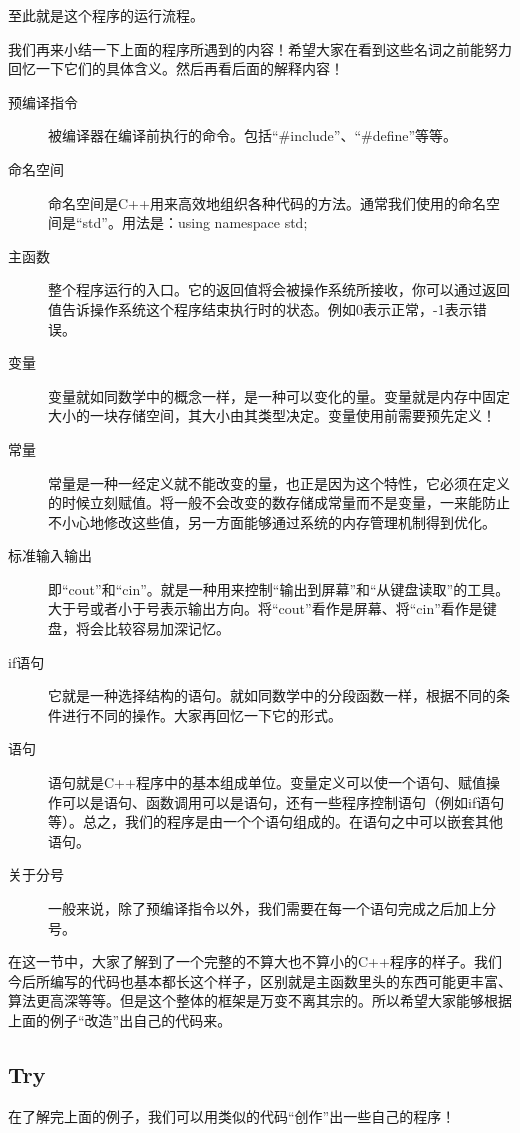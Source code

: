 至此就是这个程序的运行流程。

我们再来小结一下上面的程序所遇到的内容！希望大家在看到这些名词之前能努力回忆一下它们的具体含义。然后再看后面的解释内容！

\begin{description}
	\item[预编译指令]被编译器在编译前执行的命令。包括“\#include”、“\#define”等等。
	\item[命名空间]命名空间是C++用来高效地组织各种代码的方法。通常我们使用的命名空间是“std”。用法是：using namespace std;
	\item[主函数]整个程序运行的入口。它的返回值将会被操作系统所接收，你可以通过返回值告诉操作系统这个程序结束执行时的状态。例如0表示正常，-1表示错误。
	\item[变量]变量就如同数学中的概念一样，是一种可以变化的量。变量就是内存中固定大小的一块存储空间，其大小由其类型决定。变量使用前需要预先定义！
	\item[常量]常量是一种一经定义就不能改变的量，也正是因为这个特性，它必须在定义的时候立刻赋值。将一般不会改变的数存储成常量而不是变量，一来能防止不小心地修改这些值，另一方面能够通过系统的内存管理机制得到优化。
	\item[标准输入输出]即“cout”和“cin”。就是一种用来控制“输出到屏幕”和“从键盘读取”的工具。大于号或者小于号表示输出方向。将“cout”看作是屏幕、将“cin”看作是键盘，将会比较容易加深记忆。
	\item[if语句]它就是一种选择结构的语句。就如同数学中的分段函数一样，根据不同的条件进行不同的操作。大家再回忆一下它的形式。
	\item[语句]语句就是C++程序中的基本组成单位。变量定义可以使一个语句、赋值操作可以是语句、函数调用可以是语句，还有一些程序控制语句（例如if语句等）。总之，我们的程序是由一个个语句组成的。在语句之中可以嵌套其他语句。
	\item[关于分号]一般来说，除了预编译指令以外，我们需要在每一个语句完成之后加上分号。
\end{description}

在这一节中，大家了解到了一个完整的不算大也不算小的C++程序的样子。我们今后所编写的代码也基本都长这个样子，区别就是主函数里头的东西可能更丰富、算法更高深等等。但是这个整体的框架是万变不离其宗的。所以希望大家能够根据上面的例子“改造”出自己的代码来。

\subsection{Try}

在了解完上面的例子，我们可以用类似的代码“创作”出一些自己的程序！

